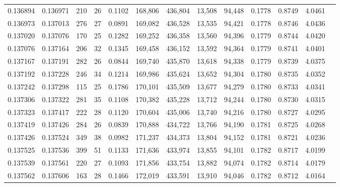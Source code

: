 \begin{tabular}{rrrrrrrrrrrrr}
0.136894 & 0.136971 &   210 &  26 &                                     0.1102 & 168,806 & 436,804 &  13,508 &  94,448 & 0.1778 & 0.8749 & 4.0461 \\
0.136973 & 0.137013 &   276 &  27 &                                     0.0891 & 169,082 & 436,528 &  13,535 &  94,421 & 0.1778 & 0.8746 & 4.0436 \\
0.137020 & 0.137076 &   170 &  25 &                                     0.1282 & 169,252 & 436,358 &  13,560 &  94,396 & 0.1779 & 0.8744 & 4.0420 \\
0.137076 & 0.137164 &   206 &  32 &                                     0.1345 & 169,458 & 436,152 &  13,592 &  94,364 & 0.1779 & 0.8741 & 4.0401 \\
0.137167 & 0.137191 &   282 &  26 &                                     0.0844 & 169,740 & 435,870 &  13,618 &  94,338 & 0.1779 & 0.8739 & 4.0375 \\
0.137192 & 0.137228 &   246 &  34 &                                     0.1214 & 169,986 & 435,624 &  13,652 &  94,304 & 0.1780 & 0.8735 & 4.0352 \\
0.137242 & 0.137298 &   115 &  25 &                                     0.1786 & 170,101 & 435,509 &  13,677 &  94,279 & 0.1780 & 0.8733 & 4.0341 \\
0.137306 & 0.137322 &   281 &  35 &                                     0.1108 & 170,382 & 435,228 &  13,712 &  94,244 & 0.1780 & 0.8730 & 4.0315 \\
0.137323 & 0.137417 &   222 &  28 &                                     0.1120 & 170,604 & 435,006 &  13,740 &  94,216 & 0.1780 & 0.8727 & 4.0295 \\
0.137419 & 0.137426 &   284 &  26 &                                     0.0839 & 170,888 & 434,722 &  13,766 &  94,190 & 0.1781 & 0.8725 & 4.0268 \\
0.137426 & 0.137524 &   349 &  38 &                                     0.0982 & 171,237 & 434,373 &  13,804 &  94,152 & 0.1781 & 0.8721 & 4.0236 \\
0.137525 & 0.137536 &   399 &  51 &                                     0.1133 & 171,636 & 433,974 &  13,855 &  94,101 & 0.1782 & 0.8717 & 4.0199 \\
0.137539 & 0.137561 &   220 &  27 &                                     0.1093 & 171,856 & 433,754 &  13,882 &  94,074 & 0.1782 & 0.8714 & 4.0179 \\
0.137562 & 0.137606 &   163 &  28 &                                     0.1466 & 172,019 & 433,591 &  13,910 &  94,046 & 0.1782 & 0.8712 & 4.0164 \\

\end{tabular}
